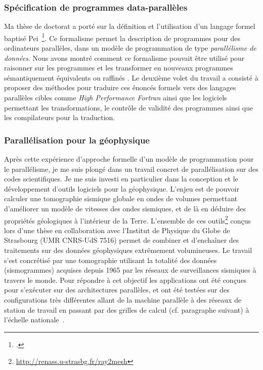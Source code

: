 \documentclass[11pt]{article}
\begin{document}
\subsubsection{Spécification de programmes data-parallèles}

Ma  thèse  de   doctorat  \cite{icps-1997-4}  a  porté  sur   la  définition  et
l'utilisation  d'un   langage  formel  baptis\'e   Pei~\footcite{Violard92}.  Ce
formalisme permet la description de  programmes pour des ordinateurs parallèles,
dans un  modèle de  programmation de type  \emph{parallélisme de  données}. Nous
avons montré comment  ce formalisme pouvait être utilisé pour  raisonner sur les
programmes et les transformer  en nouveaux programmes sémantiquement équivalents
ou    raffinés   \cite{icps-1994-46,icps-1995-1,icps-1997-3,icps-1996-2}.     Le
deuxième volet du  travail a consisté à proposer des  méthodes pour traduire ces
énoncés  formels   vers  des  langages  parallèles   cibles  comme  \textit{High
  Performance Fortran}  ainsi que les logiciels  permettant les transformations,
le  contrôle de  validité  des programmes  ainsi que  les  compilateurs pour  la
traduction.%


\subsubsection{Parallélisation pour la géophysique}

Après cette expérience d'approche formelle  d'un modèle de programmation pour le
parallélisme, je me  suis plongé dans un travail concret  de parallélisation sur
des codes scientifiques. Je me suis investi en particulier dans la conception et
le développement d'outils logiciels pour  la géophysique. L'enjeu est de pouvoir
calculer  une  tomographie  sismique  globale en  ondes  de  volumes  permettant
d'améliorer un modèle de  vitesses des ondes sismiques, et de  là en déduire des
propriétés  géologiques   à  l'intérieur   de  la   Terre.  L'ensemble   de  ces
outils\footnote{\url{http://renass.u-strasbg.fr/ray2mesh}}  conçus   lors  d'une
thèse en collaboration  avec l'Institut de Physique du Globe  de Strasbourg (UMR
CNRS-UdS 7516) permet de combiner et d'enchaîner des traitements sur des données
géophysiques  extrêmement  volumineuses. Le  travail  s'est  concrétisé par  une
tomographie  utilisant la  totalité des  données (sismogrammes)  acquises depuis
1965  par les  réseaux  de  surveillances sismiques  à  travers  le monde.  Pour
répondre à cet objectif les applications ont été conçues pour s'exécuter sur des
architectures  parallèles,  et  ont  été testées  sur  des  configurations  très
différentes allant de  la machine parallèle à des réseaux  de station de travail
en  passant par  des  grilles de  calcul (cf.  paragraphe  suivant) à  l'échelle
nationale~\cite{icps-2005-146,icps-2007-184}.
\end{document}
